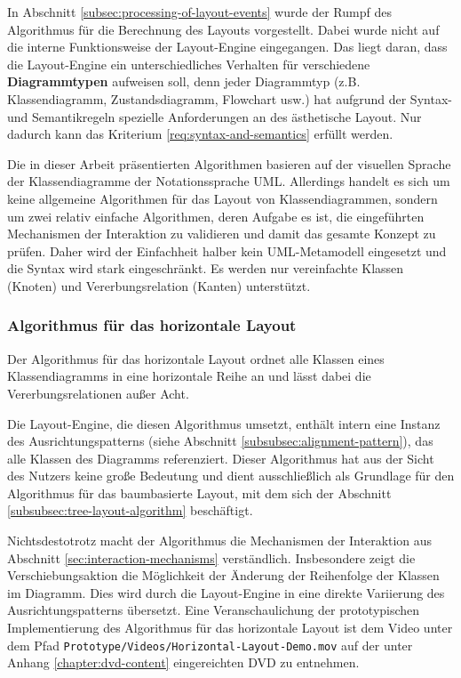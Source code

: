 In Abschnitt \ref{subsec:processing-of-layout-events} wurde der Rumpf des Algorithmus für die Berechnung des Layouts vorgestellt. Dabei wurde nicht auf die interne Funktionsweise der Layout-Engine eingegangen. Das liegt daran, dass die Layout-Engine ein unterschiedliches Verhalten für verschiedene \textbf{Diagrammtypen} aufweisen soll, denn jeder Diagrammtyp (z.B. Klassendiagramm, Zustandsdiagramm, Flowchart usw.) hat aufgrund der Syntax- und Semantikregeln spezielle Anforderungen an des ästhetische Layout. Nur dadurch kann das Kriterium \ref{req:syntax-and-semantics} erfüllt werden.

Die in dieser Arbeit präsentierten Algorithmen basieren auf der visuellen Sprache der Klassendiagramme der Notationssprache UML. Allerdings handelt es sich um keine allgemeine Algorithmen für das Layout von Klassendiagrammen, sondern um zwei relativ einfache Algorithmen, deren Aufgabe es ist, die eingeführten Mechanismen der Interaktion zu validieren und damit das gesamte Konzept zu prüfen. Daher wird der Einfachheit halber kein UML-Metamodell eingesetzt und die Syntax wird stark eingeschränkt. Es werden nur vereinfachte Klassen (Knoten) und Vererbungsrelation (Kanten) unterstützt.

\subsubsection{Algorithmus für das horizontale Layout}
\label{subsubsec:horizontal-layout-algorithm}

Der Algorithmus für das horizontale Layout ordnet alle Klassen eines Klassendiagramms in eine horizontale Reihe an und lässt dabei die Vererbungsrelationen außer Acht.

Die Layout-Engine, die diesen Algorithmus umsetzt, enthält intern eine Instanz des Ausrichtungspatterns (siehe Abschnitt \ref{subsubsec:alignment-pattern}), das alle Klassen des Diagramms referenziert. Dieser Algorithmus hat aus der Sicht des Nutzers keine große Bedeutung und dient ausschließlich als Grundlage für den Algorithmus für das baumbasierte Layout, mit dem sich der Abschnitt \ref{subsubsec:tree-layout-algorithm} beschäftigt.

Nichtsdestotrotz macht der Algorithmus die Mechanismen der Interaktion aus Abschnitt \ref{sec:interaction-mechanisms} verständlich. Insbesondere zeigt die Verschiebungsaktion die Möglichkeit der Änderung der Reihenfolge der Klassen im Diagramm. Dies wird durch die Layout-Engine in eine direkte Variierung des Ausrichtungspatterns übersetzt. Eine Veranschaulichung der prototypischen Implementierung des Algorithmus für das horizontale Layout ist dem Video unter dem Pfad \texttt{Prototype/Videos/Hori\-zon\-tal-\-Lay\-out-\-De\-mo.mov} auf der unter Anhang \ref{chapter:dvd-content} eingereichten DVD zu entnehmen.

